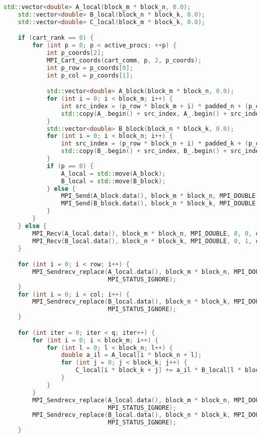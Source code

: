 \documentclass[12pt]{article}
\begin{document}
\begin{lstlisting}[language=C++]
    std::vector<double> A_local(block_m * block_n, 0.0);
    std::vector<double> B_local(block_n * block_k, 0.0);
    std::vector<double> C_local(block_m * block_k, 0.0);

    if (cart_rank == 0) {
        for (int p = 0; p < active_procs; ++p) {
            int p_coords[2];
            MPI_Cart_coords(cart_comm, p, 2, p_coords);
            int p_row = p_coords[0];
            int p_col = p_coords[1];

            std::vector<double> A_block(block_m * block_n, 0.0);
            for (int i = 0; i < block_m; i++) {
                int src_index = (p_row * block_m + i) * padded_n + (p_col * block_n);
                std::copy(A_.begin() + src_index, A_.begin() + src_index + block_n, A_block.begin() + i * block_n);
            }
            std::vector<double> B_block(block_n * block_k, 0.0);
            for (int i = 0; i < block_n; i++) {
                int src_index = (p_row * block_n + i) * padded_k + (p_col * block_k);
                std::copy(B_.begin() + src_index, B_.begin() + src_index + block_k, B_block.begin() + i * block_k);
            }
            if (p == 0) {
                A_local = std::move(A_block);
                B_local = std::move(B_block);
            } else {
                MPI_Send(A_block.data(), block_m * block_n, MPI_DOUBLE, p, 0, cart_comm);
                MPI_Send(B_block.data(), block_n * block_k, MPI_DOUBLE, p, 1, cart_comm);
            }
        }
    } else {
        MPI_Recv(A_local.data(), block_m * block_n, MPI_DOUBLE, 0, 0, cart_comm, MPI_STATUS_IGNORE);
        MPI_Recv(B_local.data(), block_n * block_k, MPI_DOUBLE, 0, 1, cart_comm, MPI_STATUS_IGNORE);
    }

    for (int i = 0; i < row; i++) {
        MPI_Sendrecv_replace(A_local.data(), block_m * block_n, MPI_DOUBLE, left_rank, 2, right_rank, 2, cart_comm,
                             MPI_STATUS_IGNORE);
    }
    for (int i = 0; i < col; i++) {
        MPI_Sendrecv_replace(B_local.data(), block_n * block_k, MPI_DOUBLE, up_rank, 3, down_rank, 3, cart_comm,
                             MPI_STATUS_IGNORE);
    }

    for (int iter = 0; iter < q; iter++) {
        for (int i = 0; i < block_m; i++) {
            for (int l = 0; l < block_n; l++) {
                double a_il = A_local[i * block_n + l];
                for (int j = 0; j < block_k; j++) {
                    C_local[i * block_k + j] += a_il * B_local[l * block_k + j];
                }
            }
        }
        MPI_Sendrecv_replace(A_local.data(), block_m * block_n, MPI_DOUBLE, left_rank, 4, right_rank, 4, cart_comm,
                             MPI_STATUS_IGNORE);
        MPI_Sendrecv_replace(B_local.data(), block_n * block_k, MPI_DOUBLE, up_rank, 5, down_rank, 5, cart_comm,
                             MPI_STATUS_IGNORE);
    }


\end{lstlisting}
\end{document}
